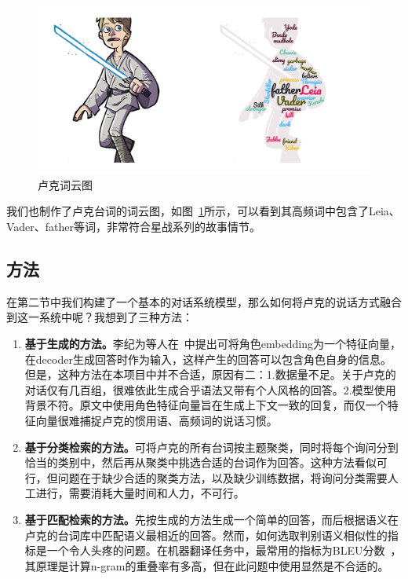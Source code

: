 \documentclass[12pt]{article} %
\begin{document}
\begin{sloppypar}
\begin{figure}[h]
	\centering
	\includegraphics[width=0.9\linewidth]{figure/luke_wc1.png}
	\caption{卢克词云图\protect\footnotemark}
	\label{fig:luke}
\end{figure}

我们也制作了卢克台词的词云图，如图~\ref{fig:luke}所示，可以看到其高频词中包含了Leia、Vader、father等词，非常符合星战系列的故事情节。

\subsection{方法}

在第二节中我们构建了一个基本的对话系统模型，那么如何将卢克的说话方式融合到这一系统中呢？我想到了三种方法：
\begin{enumerate}
	\item {\bf 基于生成的方法。}李纪为等人在~\cite{li2016persona}中提出可将角色embedding为一个特征向量，在decoder生成回答时作为输入，这样产生的回答可以包含角色自身的信息。但是，这种方法在本项目中并不合适，原因有二：1.数据量不足。关于卢克的对话仅有几百组，很难依此生成合乎语法又带有个人风格的回答。2.模型使用背景不符。原文中使用角色特征向量旨在生成上下文一致的回复，而仅一个特征向量很难捕捉卢克的惯用语、高频词的说话习惯。
	\item {\bf 基于分类检索的方法。}可将卢克的所有台词按主题聚类，同时将每个询问分到恰当的类别中，然后再从聚类中挑选合适的台词作为回答。这种方法看似可行，但问题在于缺少合适的聚类方法，以及缺少训练数据，将询问分类需要人工进行，需要消耗大量时间和人力，不可行。
	\item {\bf 基于匹配检索的方法。}先按生成的方法生成一个简单的回答，而后根据语义在卢克的台词库中匹配语义最相近的回答。然而，如何选取判别语义相似性的指标是一个令人头疼的问题。在机器翻译任务中，最常用的指标为BLEU分数~\cite{papineni2002bleu}，其原理是计算n-gram的重叠率有多高，但在此问题中使用显然是不合适的。
\end{enumerate}


\end{sloppypar}
\end{document}
